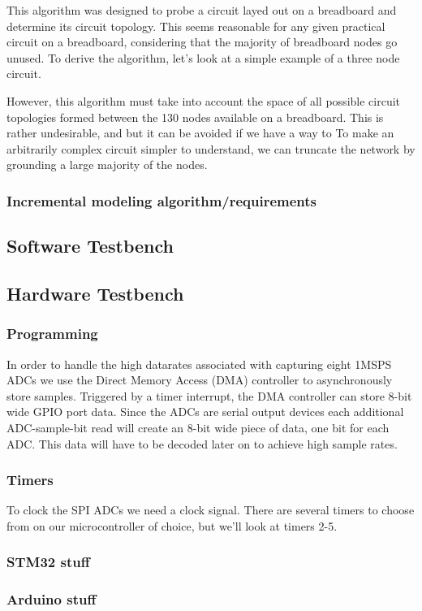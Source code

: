 \documentclass[11pt, a4paper]{article}
\begin{document}
This algorithm was designed to probe a circuit layed out on a breadboard and determine its circuit topology.
This seems reasonable for any given practical circuit on a breadboard, considering that the majority of breadboard nodes go unused.
To derive the algorithm, let's look at a simple example of a three node circuit.

However, this algorithm must take into account the space of all possible circuit topologies formed between the 130 nodes available on a breadboard.
This is rather undesirable, and but it can be avoided if we have a way to 
To make an arbitrarily complex circuit simpler to understand, we can truncate the network by grounding a large majority of the nodes.

\subsubsection{Incremental modeling algorithm/requirements}

\subsection{Software Testbench}

\subsection{Hardware Testbench}

\subsubsection{Programming}

In order to handle the high datarates associated with capturing eight 1MSPS ADCs we use the Direct Memory Access (DMA) controller to asynchronously store samples.
Triggered by a timer interrupt, the DMA controller can store 8-bit wide GPIO port data.
Since the ADCs are serial output devices each additional ADC-sample-bit read will create an 8-bit wide piece of data, one bit for each ADC.
This data will have to be decoded later on to achieve high sample rates.

\subsubsection{Timers}

To clock the SPI ADCs we need a clock signal.   
There are several timers to choose from on our microcontroller of choice, but we'll look at timers 2-5.

\subsubsection{STM32 stuff}

\subsubsection{Arduino stuff}

\begin{thebibliography}{1}
\end{thebibliography}
\end{document}
